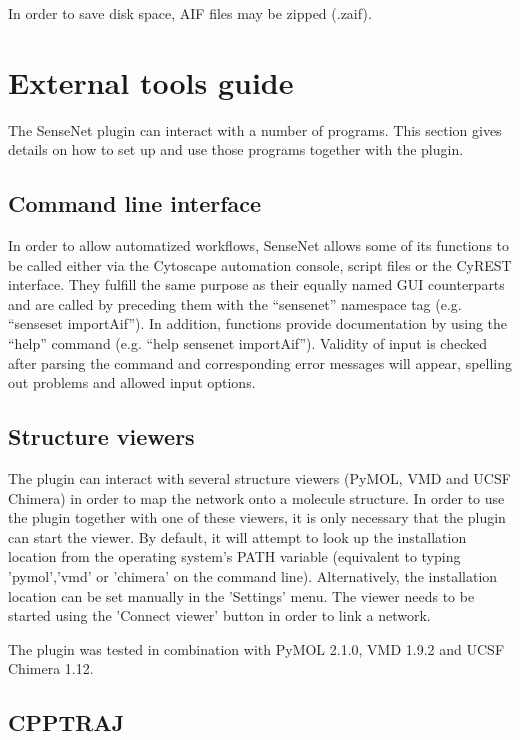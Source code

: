 In order to save disk space, AIF files may be zipped (.zaif). 

\section{External tools guide}
\label{sec:external_tools}

The SenseNet plugin can interact with a number of programs. This section gives details on how to set up and use those programs together with the plugin.

\subsection{Command line interface}
\label{sec:cli}

In order to allow automatized workflows, SenseNet allows some of its functions to be called either via the Cytoscape automation console, script files or the CyREST interface. They fulfill the same purpose as their equally named GUI counterparts and are called by preceding them with the ``sensenet'' namespace tag (e.g. ``senseset importAif''). In addition, functions provide documentation by using the ``help'' command (e.g. ``help sensenet importAif''). Validity of input is checked after parsing the command and corresponding error messages will appear, spelling out problems and allowed input options.

\subsection{Structure viewers}

The plugin can interact with several structure viewers (PyMOL, VMD and UCSF Chimera) in order to map the network onto a molecule structure. In order to use the plugin together with one of these viewers, it is only necessary that the plugin can start the viewer. By default, it will attempt to look up the installation location from the operating system's PATH variable (equivalent to typing 'pymol','vmd' or 'chimera' on the command line). Alternatively, the installation location can be set manually in the 'Settings' menu. The viewer needs to be started using the 'Connect viewer' button in order to link a network.

The plugin was tested in combination with PyMOL 2.1.0, VMD 1.9.2 and UCSF Chimera 1.12. 

\subsection{CPPTRAJ}

